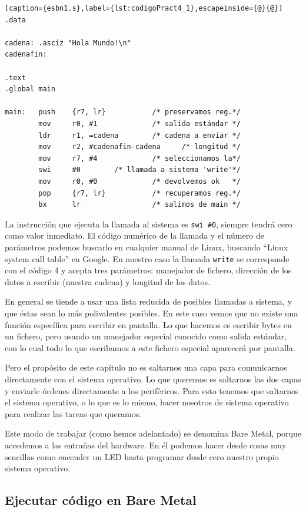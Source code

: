 \begin{lstlisting}[caption={esbn1.s},label={lst:codigoPract4_1},escapeinside={@}{@}]
.data

cadena: .asciz "Hola Mundo!\n"
cadenafin:

.text
.global main
 
main:   push    {r7, lr}           /* preservamos reg.*/
        mov     r0, #1             /* salida estándar */
        ldr     r1, =cadena        /* cadena a enviar */
        mov     r2, #cadenafin-cadena     /* longitud */
        mov     r7, #4             /* seleccionamos la*/
        swi     #0        /* llamada a sistema 'write'*/
        mov     r0, #0             /* devolvemos ok   */
        pop     {r7, lr}           /* recuperamos reg.*/
        bx      lr                 /* salimos de main */
\end{lstlisting}

La instrucción que ejecuta la llamada al sistema es {\tt swi \#0},
siempre tendrá cero como valor inmediato. El código numérico de
la llamada y el número de parámetros podemos buscarlo en cualquier
manual de Linux, buscando ``Linux system call table'' en Google. En
nuestro caso la llamada {\tt write} se corresponde con el código
4 y acepta tres parámetros: manejador de fichero, dirección de
los datos a escribir (nuestra cadena) y longitud de los datos.

En general se tiende a usar una lista reducida de posibles llamadas
a sistema, y que éstas sean lo más polivalentes posibles. En este
caso vemos que no existe una función específica para escribir en
pantalla. Lo que hacemos es escribir bytes en un fichero, pero usando
un manejador especial conocido como salida estándar, con lo cual todo
lo que escribamos a este fichero especial aparecerá por pantalla.

Pero el propósito de este capítulo no es saltarnos una capa
para comunicarnos directamente con el sistema operativo. Lo que queremos
es saltarnos las dos capas y enviarle órdenes directamente a los periféricos.
Para esto tenemos que saltarnos el sistema operativo, o lo que es lo mismo,
hacer nosotros de sistema operativo para realizar las tareas que queramos.

Este modo de trabajar (como hemos adelantado) se denomina Bare Metal, porque
accedemos a las entrañas del hardware. En él podemos hacer desde cosas
muy sencillas como encender un LED hasta programar desde cero nuestro propio
sistema operativo.

\subsection{Ejecutar código en Bare Metal}

